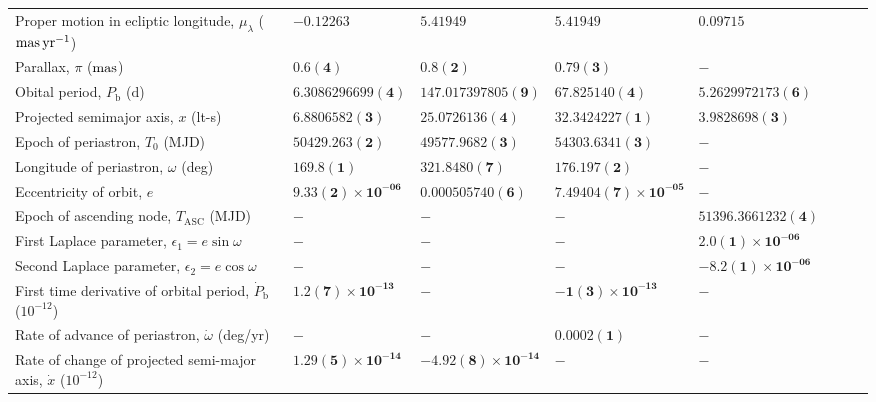 \begin{table}
\begin{tabular}{llllllll}
Proper motion in ecliptic longitude, $\mu_\lambda$ (${\rm mas}\,{\rm yr}^{-1}$)	 & 	 $\mathbf{ -0.12263 }$	 & 	 $\mathbf{ 5.41949 }$	 & 	 $\mathbf{ 5.41949 }$	 & 	 $\mathbf{ 0.09715 }$\\ 
Parallax, $\pi$ (${\rm mas}$)	 & 	 $\mathbf{ 0.6(4) }$	 & 	 $\mathbf{ 0.8(2) }$	 & 	 $\mathbf{ 0.79(3) }$	 & 	 $\mathbf{ - }$\\ 
Obital period, $P_{\mathrm{b}}$ ($\mathrm{d}$)	 & 	 $\mathbf{ 6.3086296699(4) }$	 & 	 $\mathbf{ 147.017397805(9) }$	 & 	 $\mathbf{ 67.825140(4) }$	 & 	 $\mathbf{ 5.2629972173(6) }$\\ 
Projected semimajor axis, $x$ (lt-s)	 & 	 $\mathbf{ 6.8806582(3) }$	 & 	 $\mathbf{ 25.0726136(4) }$	 & 	 $\mathbf{ 32.3424227(1) }$	 & 	 $\mathbf{ 3.9828698(3) }$\\ 
Epoch of periastron, $T_0$ (MJD)	 & 	 $\mathbf{ 50429.263(2) }$	 & 	 $\mathbf{ 49577.9682(3) }$	 & 	 $\mathbf{ 54303.6341(3) }$	 & 	 $\mathbf{ - }$\\ 
Longitude of periastron, $\omega$ (deg)	 & 	 $\mathbf{ 169.8(1) }$	 & 	 $\mathbf{ 321.8480(7) }$	 & 	 $\mathbf{ 176.197(2) }$	 & 	 $\mathbf{ - }$\\ 
Eccentricity of orbit, $e$	 & 	 $\mathbf{ 9.33(2)\times 10^{-06} }$	 & 	 $\mathbf{ 0.000505740(6) }$	 & 	 $\mathbf{ 7.49404(7)\times 10^{-05} }$	 & 	 $\mathbf{ - }$\\ 
Epoch of ascending node, $T_{\mathrm{ASC}}$ (MJD)	 & 	 $\mathbf{ - }$	 & 	 $\mathbf{ - }$	 & 	 $\mathbf{ - }$	 & 	 $\mathbf{ 51396.3661232(4) }$\\ 
First Laplace parameter, $\epsilon_1 = e \sin \omega$	 & 	 $\mathbf{ - }$	 & 	 $\mathbf{ - }$	 & 	 $\mathbf{ - }$	 & 	 $\mathbf{ 2.0(1)\times 10^{-06} }$\\ 
Second Laplace parameter, $\epsilon_2 = e \cos \omega$	 & 	 $\mathbf{ - }$	 & 	 $\mathbf{ - }$	 & 	 $\mathbf{ - }$	 & 	 $\mathbf{ -8.2(1)\times 10^{-06} }$\\ 
First time derivative of orbital period, ${\dot P}_{\mathrm{b}}$ ($10^{-12}$)	 & 	 $\mathbf{ 1.2(7)\times 10^{-13} }$	 & 	 $\mathbf{ - }$	 & 	 $\mathbf{ -1(3)\times 10^{-13} }$	 & 	 $\mathbf{ - }$\\ 
Rate of advance of periastron, ${\dot \omega}$ (deg/yr)	 & 	 $\mathbf{ - }$	 & 	 $\mathbf{ - }$	 & 	 $\mathbf{ 0.0002(1) }$	 & 	 $\mathbf{ - }$\\ 
Rate of change of projected semi-major axis, ${\dot x}$ ($10^{-12}$)	 & 	 $\mathbf{ 1.29(5)\times 10^{-14} }$	 & 	 $\mathbf{ -4.92(8)\times 10^{-14} }$	 & 	 $\mathbf{ - }$	 & 	 $\mathbf{ - }$\\ 

\end{tabular}
\end{table}
